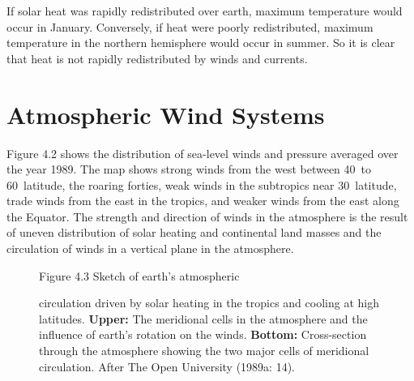 If solar heat was rapidly redistributed over earth, maximum
temperature would occur in January. Conversely, if heat were poorly
redistributed, maximum temperature in the northern hemisphere would
occur in summer. So it is clear that heat is not rapidly redistributed
by winds and currents.

\section{Atmospheric Wind Systems}
Figure 4.2 shows the distribution of sea-level winds and pressure
averaged over the year 1989. The map shows strong winds from the west
between 40\degrees\ to 60\degrees\ latitude, the roaring forties, weak
winds in the subtropics near 30\degrees\ latitude, trade winds from
the east in the tropics, and weaker winds from the east along the
Equator. The strength and direction of winds in the atmosphere is the
result of uneven distribution of solar heating and continental land
masses and the circulation of winds in a vertical plane in the
atmosphere.

\begin{figure}[b!]
\vspace{-2ex}
\footnotesize
Figure 4.3 Sketch of earth's atmospheric \rule{0mm}{3ex}circulation
driven by solar heating in the tropics and cooling at high latitudes.
\textbf{Upper:} The meridional cells in the atmosphere and the
influence of earth's rotation on the winds. \textbf{Bottom:}
Cross-section through the atmosphere showing the two major cells of
meridional circulation. After The Open University (1989a: 14).
\label{fig:atmosphere}
\end{figure}

